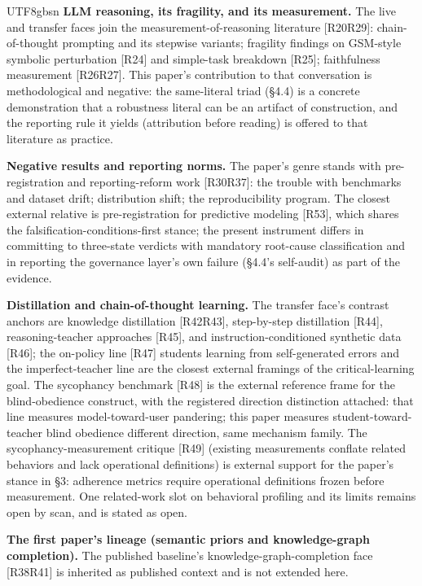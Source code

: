 \documentclass[11pt,letterpaper]{article}
\begin{document}
\begin{CJK}{UTF8}{gbsn}
\textbf{LLM reasoning, its fragility, and its measurement.} The live and transfer faces join the measurement-of-reasoning literature [R20\textendash{}R29]: chain-of-thought prompting and its stepwise variants; fragility findings on GSM-style symbolic perturbation [R24] and simple-task breakdown [R25]; faithfulness measurement [R26\textendash{}R27]. This paper's contribution to that conversation is methodological and negative: the same-literal triad (\S{}4.4) is a concrete demonstration that a robustness literal can be an artifact of construction, and the reporting rule it yields (attribution before reading) is offered to that literature as practice.

\textbf{Negative results and reporting norms.} The paper's genre stands with pre-registration and reporting-reform work [R30\textendash{}R37]: the trouble with benchmarks and dataset drift; distribution shift; the reproducibility program. The closest external relative is pre-registration for predictive modeling [R53], which shares the falsification-conditions-first stance; the present instrument differs in committing to three-state verdicts with mandatory root-cause classification and in reporting the governance layer's own failure (\S{}4.4's self-audit) as part of the evidence.

\textbf{Distillation and chain-of-thought learning.} The transfer face's contrast anchors are knowledge distillation [R42\textendash{}R43], step-by-step distillation [R44], reasoning-teacher approaches [R45], and instruction-conditioned synthetic data [R46]; the on-policy line [R47] \textemdash{} students learning from self-generated errors \textemdash{} and the imperfect-teacher line are the closest external framings of the critical-learning goal. The sycophancy benchmark [R48] is the external reference frame for the blind-obedience construct, with the registered direction distinction attached: that line measures model-toward-user pandering; this paper measures student-toward-teacher blind obedience \textemdash{} different direction, same mechanism family. The sycophancy-measurement critique [R49] (existing measurements conflate related behaviors and lack operational definitions) is external support for the paper's stance in \S{}3: adherence metrics require operational definitions frozen before measurement. One related-work slot on behavioral profiling and its limits remains open by scan, and is stated as open.

\textbf{The first paper's lineage (semantic priors and knowledge-graph completion).} The published baseline's knowledge-graph-completion face [R38\textendash{}R41] is inherited as published context and is not extended here.


\end{CJK}
\end{document}
